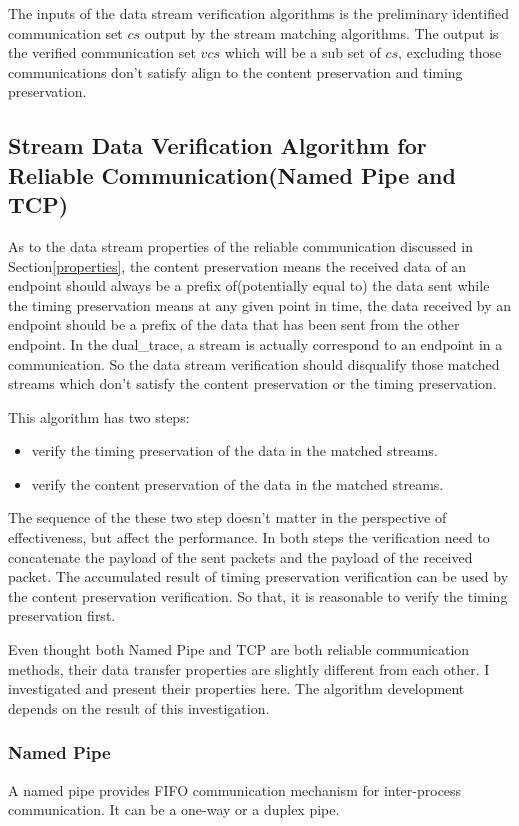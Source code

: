 The inputs of the data stream verification algorithms is the preliminary identified communication set $cs$ output by the stream matching algorithms. The output is the verified communication set $vcs$ which will be a sub set of $cs$, excluding those communications don't satisfy align to the content preservation and timing preservation.

\subsection{Stream Data Verification Algorithm for Reliable Communication(Named Pipe and TCP)}
As to the data stream properties of the reliable communication discussed in Section\ref{properties}, the content preservation means the received data of an endpoint should always be a prefix of(potentially equal to) the data sent while the timing preservation means at any given point in time, the data received by an endpoint should be a prefix of the data that has been sent from the other endpoint. In the dual\_trace, a stream is actually correspond to an endpoint in a communication. So the data stream verification should disqualify those matched streams which don't satisfy the content preservation or the timing preservation.

This algorithm has two steps: 
\begin{itemize}
\item verify the timing preservation of the data in the matched streams. 
\item verify the content preservation of the data in the matched streams. 
\end{itemize}
The sequence of the these two step doesn't matter in the perspective of effectiveness, but affect the performance. In both steps the verification need to concatenate the payload of the sent packets and the payload of the received packet. The accumulated result of timing preservation verification can be used by the content preservation verification. So that, it is reasonable to verify the timing preservation first.

Even thought both Named Pipe and TCP are both reliable communication methods, their data transfer properties are slightly different from each other. I investigated and present their properties here. The algorithm development depends on the result of this investigation.
 
\subsubsection{Named Pipe}\label{namedpipe}
A named pipe provides FIFO communication mechanism for inter-process communication. It can be a one-way or a duplex pipe. \cite{khambattinamed}

